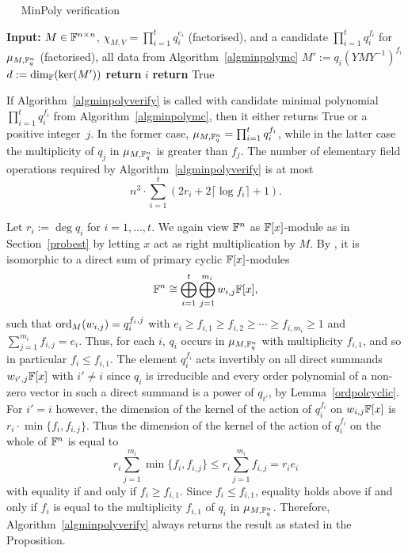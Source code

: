 \begin{algorithm}
\caption{$\quad$ \sc MinPoly verification}
\label{algminpolyverify}
\begin{algorithmic}
\STATE \textbf{Input:} $M \in \mathbb{F}^{n \times n}$, $\chi_{M,V} = \prod_{i=1}^t q_i^{e_i}$ (factorised), 
and a candidate $\prod_{i=1}^t q_i^{f_i}$ for $\mu_{M,\mathbb{F}_q^n}$ (factorised),
\STATE \hspace*{0mm} %
all data from Algorithm~\ref{algminpolymc}
        \STATE $M' := q_i(YMY^{-1})^{f_i}$
        \STATE $d := \dim_{\mathbb{F}}( \ker(M') )$
            \STATE \textbf{return} $i$
        \ENDIF
    \ENDIF
\ENDFOR
\STATE \textbf{return} {\sc True}
\end{algorithmic}
\end{algorithm}

\begin{Prop}
\label{propverify}

If Algorithm~\ref{algminpolyverify} is called with candidate minimal polynomial
$\prod_{i=1}^t q_i^{f_i}$ from Algorithm~\ref{algminpolymc}, 
then it either returns {\sc True} or a 
positive integer~$j$.
In the former case, $\mu_{M,\mathbb{F}_q^n}=\prod_{i=1}^t q_i^{f_i}$,
while in the latter case the
multiplicity of $q_j$ in  $\mu_{M,\mathbb{F}_q^n}$ is greater than $f_j$.
The number of elementary field operations required by 
Algorithm~\ref{algminpolyverify} is at most
\[ 
 n^3 \cdot \sum_{i=1}^t \left( 2r_i + 2\lceil \log f_i \rceil+1 \right).
\] 
\end{Prop}

\proofbeg Let $r_i := \deg q_i$ for $i = 1, \ldots, t$.
We again view $\mathbb{F}^n$ as $\mathbb{F}[x]$-module as in Section~\ref{probest} by
letting $x$ act as right multiplication by $M$. By 
\cite[Theorem~3.12]{Jacob1}, it is isomorphic to a direct sum of 
primary cyclic $\mathbb{F}[x]$-modules
\[ 
\mathbb{F}^n \cong \bigoplus_{i=1}^t \bigoplus_{j=1}^{m_i} w_{i,j} \mathbb{F}[x], 
\]
such that $\mathrm{ord}_M(w_{i,j}) = q_i^{f_i,j}$ with 
$e_i \ge f_{i,1} \ge f_{i,2} \ge \cdots \ge f_{i,m_i} \ge 1$ and
$\sum_{j=1}^{m_i} f_{i,j} = e_i$. Thus, for each $i$,
$q_i$ occurs in  $\mu_{M,\mathbb{F}_q^n}$ with multiplicity $f_{i,1}$,
and so in particular $f_i\le f_{i,1}$.
The element $q_i^{f_i}$ acts
invertibly on all direct summands $w_{i',j} \mathbb{F}[x]$ with $i' \neq i$
since $q_i$ is irreducible and every order polynomial of a non-zero vector
in such a direct summand is a power of $q_{i'}$, by 
Lemma~\ref{ordpolcyclic}. For $i' = i$ however, the dimension of the kernel 
of the action of $q_i^{f_i}$ on $w_{i,j} \mathbb{F}[x]$ is 
$r_i \cdot \min\{f_i,f_{i,j}\}$.
Thus the dimension of the kernel of the action of $q_i^{f_i}$ on the
whole of $\mathbb{F}^n$ is equal to 
\[
r_i\sum_{j=1}^{m_i}\min\{f_i,f_{i,j}\}
\le r_i\sum_{j=1}^{m_i}f_{i,j}=r_ie_i
\]
with equality if and only if $f_i\ge f_{i,1}$. 
Since $f_i\le f_{i,1}$, equality holds above if and only if $f_i$
is equal to the multiplicity $f_{i,1}$ of $q_i$ in  $\mu_{M,\mathbb{F}_q^n}$.
Therefore, Algorithm~\ref{algminpolyverify} always returns the
result as stated in the Proposition.

